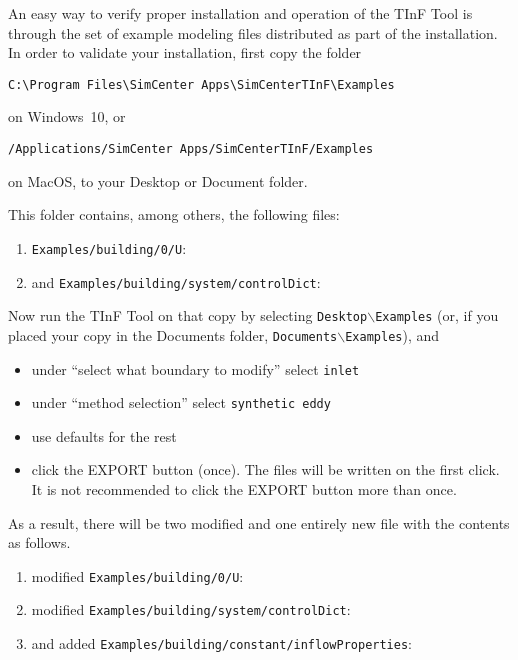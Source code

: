 An easy way to verify proper installation and operation of the TInF Tool is through the set of example modeling files
distributed as part of the installation.  In order to validate your installation, first copy the folder
\begin{verbatim}
C:\Program Files\SimCenter Apps\SimCenterTInF\Examples
\end{verbatim}
on Windows~10, or
\begin{verbatim}
/Applications/SimCenter Apps/SimCenterTInF/Examples
\end{verbatim}
on MacOS,
to your Desktop or Document folder.
\medskip

\noindent
This folder contains, among others, the following files:
\begin{enumerate}
\item
	\texttt{Examples/building/0/U}:
	
	
\item 
	and \texttt{Examples/building/system/controlDict}:
	
	
\end{enumerate}

\noindent
Now run the TInF Tool on that copy by selecting \texttt{Desktop$\backslash$Examples}
(or, if you placed your copy in the Documents folder, \texttt{Documents$\backslash$Examples}), and 
\begin{itemize}
\item under ``select what boundary to modify'' select \texttt{inlet}
\item under ``method selection'' select \texttt{synthetic eddy}
\item use defaults for the rest
\item click the EXPORT button (once). The files will be written on the first click. It is not recommended to click the EXPORT button more than once.\end{itemize}

\noindent
As a result, there will be two modified and one entirely new file with the contents as follows.
\begin{enumerate}
\item
	modified \texttt{Examples/building/0/U}:
	

\item
	modified \texttt{Examples/building/system/controlDict}:
	

\item 
	and added \texttt{Examples/building/constant/inflowProperties}:
	
	
\end{enumerate}
